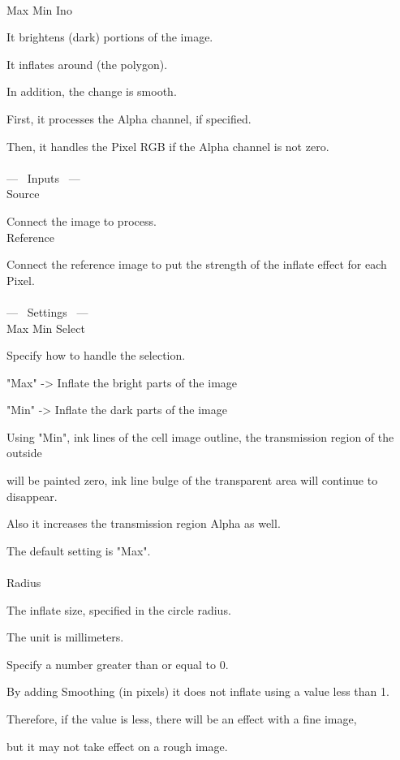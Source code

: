\documentclass[a4paper,12pt]{article}
\begin{document}
\thispagestyle{empty}

\Large
\noindent \\
Max Min Ino\medskip
\par
\normalsize
It brightens (dark) portions of the image.\\
\par
It inflates around (the polygon).\par
In addition, the change is smooth.\\
\par
First, it processes the Alpha channel, if specified.\par
Then, it handles the Pixel RGB if the Alpha channel is not zero.\\
\\
--- \ Inputs \ ---\\
Source\par
Connect the image to process.\\
Reference\par
Connect the reference image to put the strength of the inflate effect for each Pixel.\\
\\
--- \ Settings \ ---\\
Max Min Select\par
Specify how to handle the selection.\par
"Max" -> Inflate the bright parts of the image\par
"Min" -> Inflate the dark parts of the image\par
Using "Min", ink lines of the cell image outline, the transmission region of the outside\par
will be painted zero, ink line bulge of the transparent area will continue to disappear.\par
Also it increases the transmission region Alpha as well.\par
The default setting is "Max".\\
\\
Radius\par
The inflate size, specified in the circle radius.\par
The unit is millimeters.\par
Specify a number greater than or equal to 0.\par
By adding Smoothing (in pixels) it does not inflate using a value less than 1.\par
Therefore, if the value is less, there will be an effect with a fine image,\par
but it may not take effect on a rough image.\par
\end{document}
